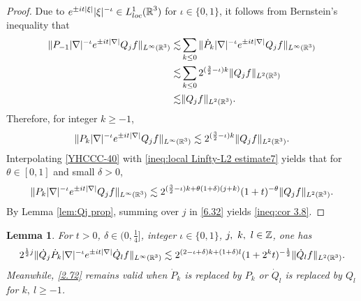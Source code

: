 \documentclass[11pt,twoside]{article}
\def\Z{\mathop{\mathbb Z\kern 0pt}\nolimits}
\def\R{\mathop{\mathbb R\kern 0pt}\nolimits}
\def\f{\frac}
\def\ls{\lesssim}
\newcommand{\pk}{\dot{P}_k}
\newcommand{\q}{\dot{Q}}
\theoremstyle{plain}
\newtheorem{lemma}[theorem]{Lemma}
\theoremstyle{definition}
\numberwithin{equation}{section}
\begin{document}
	\begin{proof}
		Due to $e^{\pm it|\xi|}|\xi|^{-\iota}\in L^1_{loc}(\R^3)$ for $\iota\in\{0,1\}$, it follows from Bernstein's inequality that
		\begin{equation*}
			\begin{split}
				\|P_{-1}|\nabla|^{-\iota}e^{\pm it|\nabla|}Q_j  f\|_{L^\infty(\R^3)}
				\lesssim&
				\sum_{k\le0}\|\dot{P}_{k}|\nabla|^{-\iota}e^{\pm it|\nabla|}Q_j  f\|_{L^\infty(\R^3)}\\
				\ls&
				\sum_{k\le0}2^{(\f32-\iota) k}\| Q_j f\|_{L^2(\R^3)}\\
				\ls&
				\| Q_j f\|_{L^2(\R^3)}.
			\end{split}
		\end{equation*}
		Therefore, for integer $k\ge -1$,
		\begin{equation}\label{YHCCC-40}
			\begin{split}
				\|P_{k}|\nabla|^{-\iota}e^{\pm it|\nabla|}Q_j  f\|_{L^\infty(\R^3)}
				\ls
				2^{(\f32-\iota) k}\| Q_j f\|_{L^2(\R^3)}.
			\end{split}
		\end{equation}
		Interpolating \eqref{YHCCC-40} with \eqref{ineq:local Linfty-L2 estimate7} yields that for $\theta\in[0,1]$ and small $\delta>0$,
		\begin{equation}\label{6.32}
			\|P_{k}|\nabla|^{-\iota}e^{\pm it|\nabla|}Q_j  f\|_{L^\infty(\R^3)}
			\ls
			2^{(\f32-\iota) k+\theta(1+\delta)(j+k)}(1+t)^{-\theta}\| Q_j f\|_{L^2(\R^3)}.
		\end{equation}
		By Lemma \ref{lem:Qj prop}, summing over $j$ in \eqref{6.32} yields \eqref{ineq:cor 3.8}.
	\end{proof}
	\begin{lemma}\label{lem:Technical lemma 2}
			For $t>0$, $\delta\in(0,\f14]$, integer $\iota\in\{0,1\}$, $j,\ k,\ l\in\Z$, one has
			\begin{equation}\label{2.72}
				2^{\f12 j}\|\q_j \dot{P}_k |\nabla|^{-\iota}e^{\pm it|\nabla|}\q_l f\|_{L^\infty(\R^3)}
				\ls
				2^{(2-\iota+\delta) k+(1+\delta)l}(1+2^kt)^{-\f12}\|\q_{l} f\|_{L^2(\R^3)}.
			\end{equation}
			Meanwhile, \eqref{2.72} remains valid when $\pk$ is replaced by $P_k$ or $\q_l$ is replaced by $Q_l$ for $k,\ l\ge -1$.
	\end{lemma}
\end{document}
